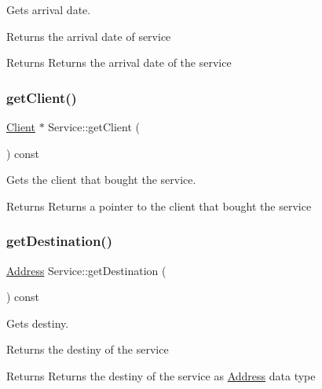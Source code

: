 Gets arrival date. 

Returns the arrival date of service

\begin{DoxyReturn}{Returns}
Returns the arrival date of the service 
\end{DoxyReturn}
\mbox{\label{class_service_a4a9cc0a45f030f69b3d6468df5d02aaa}} 
\subsubsection{\texorpdfstring{get\+Client()}{getClient()}}
{\footnotesize\ttfamily \hyperlink{class_client}{Client} $\ast$ Service\+::get\+Client (\begin{DoxyParamCaption}{ }\end{DoxyParamCaption}) const}



Gets the client that bought the service. 

\begin{DoxyReturn}{Returns}
Returns a pointer to the client that bought the service 
\end{DoxyReturn}
\mbox{\label{class_service_a2aabf308bd77e1de07afa28d5ff72b08}} 
\subsubsection{\texorpdfstring{get\+Destination()}{getDestination()}}
{\footnotesize\ttfamily \hyperlink{class_address}{Address} Service\+::get\+Destination (\begin{DoxyParamCaption}{ }\end{DoxyParamCaption}) const}



Gets destiny. 

Returns the destiny of the service

\begin{DoxyReturn}{Returns}
Returns the destiny of the service as \hyperlink{class_address}{Address} data type 
\end{DoxyReturn}
\mbox{\label{class_service_a7b36594e1a24656f065f7d41b79bb718}} 
